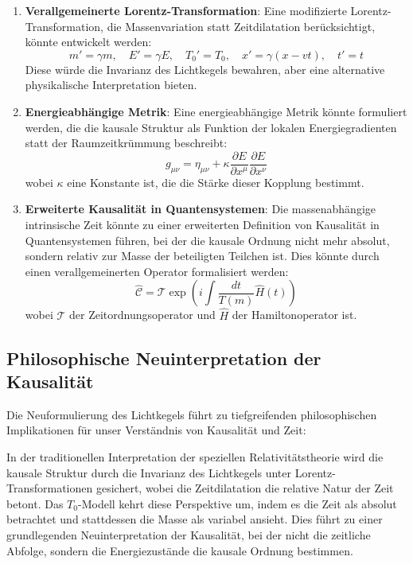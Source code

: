 \documentclass[a4paper,12pt]{article}
\begin{document}
			\begin{enumerate}
			\item \textbf{Verallgemeinerte Lorentz-Transformation}: Eine modifizierte Lorentz-Transformation, die Massenvariation statt Zeitdilatation berücksichtigt, könnte entwickelt werden:
			\begin{equation}
				m' = \gamma m, \quad E' = \gamma E, \quad T_0' = T_0, \quad x' = \gamma(x - vt), \quad t' = t
			\end{equation}
			Diese würde die Invarianz des Lichtkegels bewahren, aber eine alternative physikalische Interpretation bieten.
			\item \textbf{Energieabhängige Metrik}: Eine energieabhängige Metrik könnte formuliert werden, die die kausale Struktur als Funktion der lokalen Energiegradienten statt der Raumzeitkrümmung beschreibt:
			\begin{equation}
				g_{\mu\nu} = \eta_{\mu\nu} + \kappa \frac{\partial E}{\partial x^\mu}\frac{\partial E}{\partial x^\nu}
			\end{equation}
			wobei \( \kappa \) eine Konstante ist, die die Stärke dieser Kopplung bestimmt.
			\item \textbf{Erweiterte Kausalität in Quantensystemen}: Die massenabhängige intrinsische Zeit könnte zu einer erweiterten Definition von Kausalität in Quantensystemen führen, bei der die kausale Ordnung nicht mehr absolut, sondern relativ zur Masse der beteiligten Teilchen ist. Dies könnte durch einen verallgemeinerten Operator formalisiert werden:
			\begin{equation}
				\hat{\mathcal{C}} = \mathcal{T} \exp\left(i\int \frac{dt}{T(m)} \hat{H}(t)\right)
			\end{equation}
			wobei \( \mathcal{T} \) der Zeitordnungsoperator und \( \hat{H} \) der Hamiltonoperator ist.
			\end{enumerate}
			
			\subsection{Philosophische Neuinterpretation der Kausalität}
			Die Neuformulierung des Lichtkegels führt zu tiefgreifenden philosophischen Implikationen für unser Verständnis von Kausalität und Zeit:
			
			In der traditionellen Interpretation der speziellen Relativitätstheorie wird die kausale Struktur durch die Invarianz des Lichtkegels unter Lorentz-Transformationen gesichert, wobei die Zeitdilatation die relative Natur der Zeit betont. Das \( T_0 \)-Modell kehrt diese Perspektive um, indem es die Zeit als absolut betrachtet und stattdessen die Masse als variabel ansieht. Dies führt zu einer grundlegenden Neuinterpretation der Kausalität, bei der nicht die zeitliche Abfolge, sondern die Energiezustände die kausale Ordnung bestimmen.
			
\end{document}
